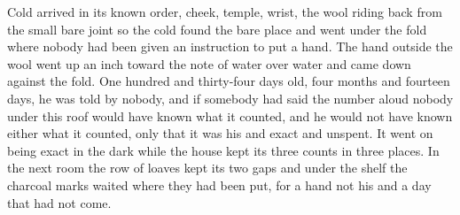 Cold arrived in its known order, cheek, temple, wrist, the wool riding back from the small bare joint so the cold found the bare place and went under the fold where nobody had been given an instruction to put a hand. The hand outside the wool went up an inch toward the note of water over water and came down against the fold. One hundred and thirty-four days old, four months and fourteen days, he was told by nobody, and if somebody had said the number aloud nobody under this roof would have known what it counted, and he would not have known either what it counted, only that it was his and exact and unspent. It went on being exact in the dark while the house kept its three counts in three places. In the next room the row of loaves kept its two gaps and under the shelf the charcoal marks waited where they had been put, for a hand not his and a day that had not come.
